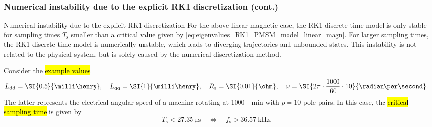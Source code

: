 \begin{frame}
    \frametitle{Numerical instability due to the explicit RK1 discretization (cont.)}
    \begin{varblock}{Numerical instability due to the explicit RK1 discretization}
        For the above linear magnetic case, the RK1 discrete-time model is only stable for sampling times $T_\mathrm{s}$ smaller than a critical value given by \eqref{eq:eigenvalues_RK1_PMSM_model_linear_magn}. For larger sampling times, the RK1 discrete-time model is numerically unstable, which leads to diverging trajectories and unbounded states. This instability is not related to the physical system, but is solely caused by the numerical discretization method.
    \end{varblock}\pause%
    Consider the \hl{example values}
    $$
        L_{\mathrm{dd}} = \SI{0.5}{\milli\henry}, \quad L_{\mathrm{qq}} = \SI{1}{\milli\henry}, \quad R_\mathrm{s} = \SI{0.01}{\ohm}, \quad \omega = \SI{2\pi \cdot \frac{1000}{60}\cdot10}{\radian\per\second}.
    $$
    The latter represents the electrical angular speed of a machine rotating at \SI[per-mode=fraction, fraction-command=\nicefrac]{1000}{\per\minute} with $p=10$ pole pairs. \pause In this case, the \hl{critical sampling time} is given by
    $$
        T_\mathrm{s} < \SI{27.35}{\micro\second} \quad \Leftrightarrow \quad f_\mathrm{s} > \SI{36.57}{\kilo\hertz}.
    $$
\end{frame}


